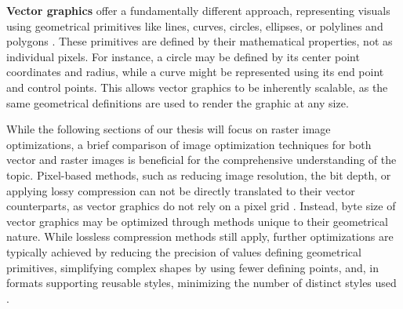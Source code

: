 




\textbf{Vector graphics} offer a fundamentally different approach, representing visuals using geometrical primitives like lines, curves, circles, ellipses, or polylines and polygons \cite{mortenson1999mathematics-for-computer-graphics}. These primitives are defined by their mathematical properties, not as individual pixels. For instance, a circle may be defined by its center point coordinates and radius, while a curve might be represented using its end point and control points. This allows vector graphics to be inherently scalable, as the same geometrical definitions are used to render the graphic at any size.


While the following sections of our thesis will focus on raster image optimizations, a brief comparison of image optimization techniques for both vector and raster images is beneficial for the comprehensive understanding of the topic. Pixel-based methods, such as reducing image resolution, the bit depth, or applying lossy compression can not be directly translated to their vector counterparts, as vector graphics do not rely on a pixel grid \cite{libby2018beginning-svg}. Instead, byte size of vector graphics may be optimized through methods unique to their geometrical nature. While lossless compression methods still apply, further optimizations are typically achieved by reducing the precision of values defining geometrical primitives, simplifying complex shapes by using fewer defining points, and, in formats supporting reusable styles, minimizing the number of distinct styles used \cite{marty2015svg}.

